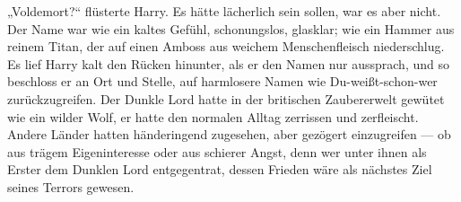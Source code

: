 „Voldemort?“ flüsterte Harry. Es hätte lächerlich sein sollen, war es aber nicht. Der Name war wie ein kaltes Gefühl, schonungslos, glasklar; wie ein Hammer aus reinem Titan, der auf einen Amboss aus weichem Menschenfleisch niederschlug. Es lief Harry kalt den Rücken hinunter, als er den Namen nur aussprach, und so beschloss er an Ort und Stelle, auf harmlosere Namen wie Du-weißt-schon-wer zurückzugreifen.
Der Dunkle Lord hatte in der britischen Zaubererwelt gewütet wie ein wilder Wolf, er hatte den normalen Alltag zerrissen und zerfleischt. Andere Länder hatten händeringend zugesehen, aber gezögert einzugreifen — ob aus trägem Eigeninteresse oder aus schierer Angst, denn wer unter ihnen als Erster dem Dunklen Lord entgegentrat, dessen Frieden wäre als nächstes Ziel seines Terrors gewesen.

